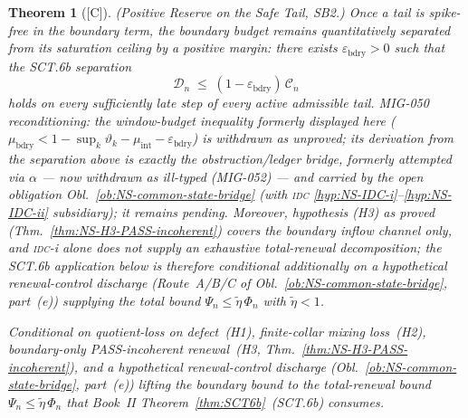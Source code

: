 \documentclass[12pt,oneside]{amsbook}
\theoremstyle{plain}
\newtheorem{theorem}{Theorem}[section]
\theoremstyle{definition}
\theoremstyle{remark}
\newcommand{\status}[1]{\textup{[#1]}}
\begin{document}
\begin{theorem}[\status{C}]\label{thm:NSSB2}
\textup{(Positive Reserve on the Safe Tail, SB2.)} Once a tail
is spike-free in the boundary term, the boundary budget remains
quantitatively separated from its saturation ceiling by a
positive margin: there exists $\varepsilon_{\mathrm{bdry}} > 0$
such that the SCT.6b separation
\[
 \mathcal{D}_n \;\leq\; (1-\varepsilon_{\mathrm{bdry}})\,
 \mathcal{C}_n
\]
holds on every sufficiently late step of every active admissible
tail. \emph{MIG-050 reconditioning:} the window-budget inequality
formerly displayed here
($\mu_{\mathrm{bdry}} < 1-\sup_k\vartheta_k-\mu_{\mathrm{int}}
-\varepsilon_{\mathrm{bdry}}$) is withdrawn as unproved; its
derivation from the separation above is exactly the
obstruction/ledger bridge, formerly attempted via $\alpha$ --- now
withdrawn as ill-typed (MIG-052) --- and carried by the open
obligation Obl.~\ref{ob:NS-common-state-bridge} (with \textsc{idc}
\eqref{hyp:NS-IDC-i}--\eqref{hyp:NS-IDC-ii} subsidiary); it
remains pending. Moreover, hypothesis (H3) as proved
(Thm.~\ref{thm:NS-H3-PASS-incoherent}) covers the \emph{boundary}
inflow channel only, and \textsc{idc}-i alone does \emph{not}
supply an exhaustive total-renewal decomposition; the SCT.6b
application below is therefore conditional additionally on a
hypothetical renewal-control discharge (Route~A/B/C of
Obl.~\ref{ob:NS-common-state-bridge}, part~(e)) supplying the total
bound $\Psi_n \leq \widetilde\eta\,\Phi_n$ with
$\widetilde\eta < 1$.

\textup{Conditional on} quotient-loss on defect~(H1), finite-collar
mixing loss~(H2), \emph{boundary-only} PASS-incoherent renewal~(H3,
Thm.~\ref{thm:NS-H3-PASS-incoherent}), \emph{and} a hypothetical
renewal-control discharge (Obl.~\ref{ob:NS-common-state-bridge},
part~(e)) lifting the boundary bound to the total-renewal bound
$\Psi_n \leq \widetilde\eta\,\Phi_n$ that Book~II
Theorem~\ref{thm:SCT6b}~(SCT.6b) consumes.
\end{theorem}
\end{document}
